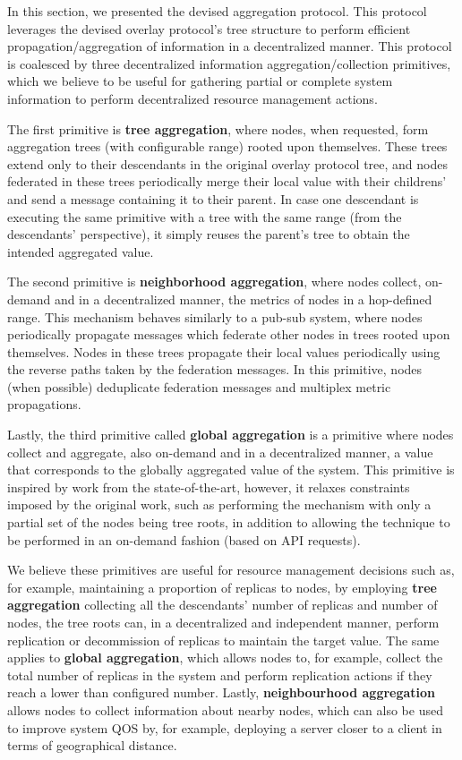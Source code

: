 In this section, we presented the devised aggregation protocol. This protocol leverages the devised overlay protocol's tree structure to perform efficient propagation/aggregation of information in a decentralized manner. This protocol is coalesced by three decentralized information aggregation/collection primitives, which we believe to be useful for gathering partial or complete system information to perform decentralized resource management actions. 

The first primitive is \textbf{tree aggregation}, where nodes, when requested, form aggregation trees (with configurable range) rooted upon themselves. These trees extend only to their descendants in the original overlay protocol tree, and nodes federated in these trees periodically merge their local value with their childrens' and send a message containing it to their parent. In case one descendant is executing the same primitive with a tree with the same range (from the descendants' perspective), it simply reuses the parent's tree to obtain the intended aggregated value. 

The second primitive is \textbf{neighborhood aggregation}, where nodes collect, on-demand and in a decentralized manner, the metrics of nodes in a hop-defined range. This mechanism behaves similarly to a pub-sub system, where nodes periodically propagate messages which federate other nodes in trees rooted upon themselves. Nodes in these trees propagate their local values periodically using the reverse paths taken by the federation messages. In this primitive, nodes (when possible) deduplicate federation messages and multiplex metric propagations.

Lastly, the third primitive called \textbf{global aggregation} is a primitive where nodes collect and aggregate, also on-demand and in a decentralized manner, a value that corresponds to the globally aggregated value of the system. This primitive is inspired by work from the state-of-the-art, however, it relaxes constraints imposed by the original work, such as performing the mechanism with only a partial set of the nodes being tree roots, in addition to allowing the technique to be performed in an on-demand fashion (based on API requests).

We believe these primitives are useful for resource management decisions such as, for example, maintaining a proportion of replicas to nodes, by employing \textbf{tree aggregation} collecting all the descendants' number of replicas and number of nodes, the tree roots can, in a decentralized and independent manner, perform replication or decommission of replicas to maintain the target value. The same applies to \textbf{global aggregation}, which allows nodes to, for example, collect the total number of replicas in the system and perform replication actions if they reach a lower than configured number. Lastly, \textbf{neighbourhood aggregation} allows nodes to collect information about nearby nodes, which can also be used to improve system QOS by, for example, deploying a server closer to a client in terms of geographical distance.

